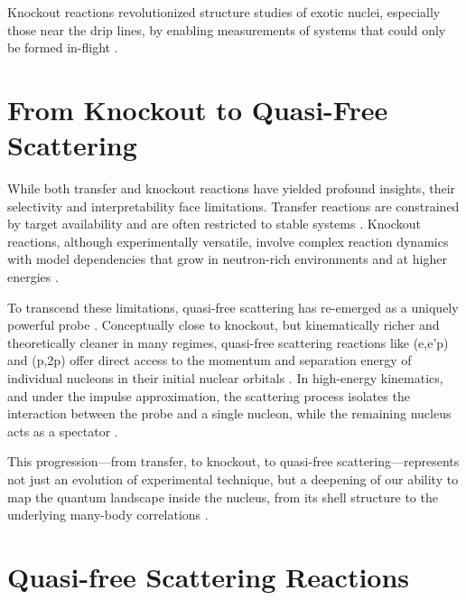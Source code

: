 Knockout reactions revolutionized structure studies of exotic nuclei, especially those near the drip lines, by enabling measurements of systems that could only be formed in-flight \cite{casten_study_2000, gade_reduction_2008, panin_quasi-free_2021}.

\section{From Knockout to Quasi-Free Scattering}

While both transfer and knockout reactions have yielded profound insights, their selectivity and interpretability face limitations. Transfer reactions are constrained by target availability and are often restricted to stable systems \cite{casten_study_2000}. Knockout reactions, although experimentally versatile, involve complex reaction dynamics with model dependencies that grow in neutron-rich environments and at higher energies \cite{aumann_quasifree_2013, panin_quasi-free_2019}.

To transcend these limitations, quasi-free scattering has re-emerged as a uniquely powerful probe \cite{panin_quasi-free_2021}. Conceptually close to knockout, but kinematically richer and theoretically cleaner in many regimes, quasi-free scattering reactions like (e,e'p) and (p,2p) offer direct access to the momentum and separation energy of individual nucleons in their initial nuclear orbitals \cite{panin_quasi-free_2021, panin_exclusive_2016}. In high-energy kinematics, and under the impulse approximation, the scattering process isolates the interaction between the probe and a single nucleon, while the remaining nucleus acts as a spectator \cite{panin_quasi-free_2021, panin_exclusive_2016}.

This progression—from transfer, to knockout, to quasi-free scattering—represents not just an evolution of experimental technique, but a deepening of our ability to map the quantum landscape inside the nucleus, from its shell structure to the underlying many-body correlations \cite{panin_quasi-free_2021}.


\section{Quasi-free Scattering Reactions}


